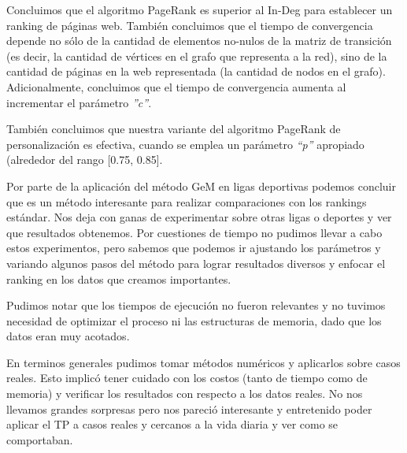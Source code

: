 \par Concluimos que el algoritmo PageRank es superior al In-Deg para establecer un ranking de p\'aginas web.
Tambi\'en concluimos que el tiempo de convergencia depende no s\'olo de la cantidad de elementos no-nulos de la matriz de transici\'on (es decir, la cantidad de v\'ertices en el grafo que representa a la red), sino de la cantidad de p\'aginas en la web representada (la cantidad de nodos en el grafo).
Adicionalmente, concluimos que el tiempo de convergencia aumenta al incrementar el par\'ametro \textit{''c''}.
\par Tambi\'en concluimos que nuestra variante del algoritmo PageRank de personalizaci\'on es efectiva, cuando se emplea un par\'ametro \textit{``p''} apropiado (alrededor del rango [0.75, 0.85].

\bigskip

\par Por parte de la aplicaci\'on del m\'etodo GeM en ligas deportivas podemos concluir que es un m\'etodo interesante para realizar comparaciones con los rankings est\'andar. Nos deja con ganas de experimentar sobre otras ligas o deportes y ver que resultados obtenemos. Por cuestiones de tiempo no pudimos llevar a cabo estos experimentos, pero sabemos que podemos ir ajustando los par\'ametros y variando algunos pasos del m\'etodo para lograr resultados diversos y enfocar el ranking en los datos que creamos importantes.
\par Pudimos notar que los tiempos de ejecuci\'on no fueron relevantes y no tuvimos necesidad de optimizar el proceso ni las estructuras de memoria, dado que los datos eran muy acotados.
\par 

\bigskip

\par En terminos generales pudimos tomar m\'etodos num\'ericos y aplicarlos sobre casos reales. Esto implic\'o tener cuidado con los costos (tanto de tiempo como de memoria) y verificar los resultados con respecto a los datos reales. No nos llevamos grandes sorpresas pero nos pareci\'o interesante y entretenido poder aplicar el TP a casos reales y cercanos a la vida diaria y ver como se comportaban.